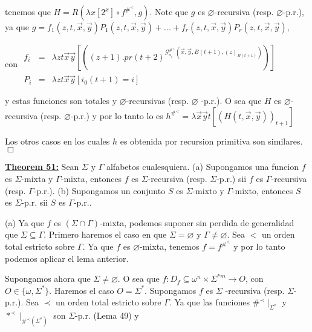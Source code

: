 tenemos que \(H=R(\lambda x\left[ 2^{x}\right] \circ f^{\#^{< }},g)\). Note que \(g\) es \(\varnothing \)-recursiva (resp. \(\varnothing \)-p.r.), ya que
\(\displaystyle g=f_{1}(z,t,\vec{x},\vec{y})P_{1}(z,t,\vec{x},\vec{y})+...+f_{r}(z,t,\vec{x}, \vec{y})P_{r}(z,t,\vec{x},\vec{y})\text{,} \)

con
\(\displaystyle \begin{array}{rcl} f_{i} & =& \lambda zt\vec{x}\vec{y}\left[ \left( (z+1).pr(t+2)^{\mathcal{G} _{a_{i}}^{\#^{< }}(\vec{x},\vec{y},B(t+1),(z)_{B(t+1)})}\right) \right] \\ P_{i} & =& \lambda zt\vec{x}\vec{y}\left[ i_{0}(t+1)=i\right] \end{array} \)

y estas funciones son totales y \(\varnothing \)-recursivas (resp. \(\varnothing \) -p.r.). O sea que \(H\) es \(\varnothing \)-recursiva (resp. \(\varnothing \)-p.r.) y por lo tanto lo es
\(\displaystyle h^{\#^{< }}=\lambda \vec{x}\vec{y}t\left[ (H(t,\vec{x},\vec{y}))_{t+1}\right] \)

Los otros casos en los cuales \(h\) es obtenida por recursion primitiva son similares. \(\Box\)


\textbf{\underline{Theorem 51:}} Sean \(\Sigma \) y \(\Gamma \) alfabetos cualesquiera.
(a) Supongamos una funcion \(f\) es \(\Sigma \)-mixta y \(\Gamma \)-mixta, entonces \(f\) es \(\Sigma \)-recursiva (resp. \(\Sigma \)-p.r.) sii \(f\) es \( \Gamma \)-recursiva (resp. \(\Gamma \)-p.r.).
(b) Supongamos un conjunto \(S\) es \(\Sigma \)-mixto y \(\Gamma \)-mixto, entonces \(S\) es \(\Sigma \)-p.r. sii \(S\) es \(\Gamma \)-p.r..


\PROOF (a) Ya que \(f\) es \((\Sigma \cap \Gamma )\)-mixta, podemos suponer sin perdida de generalidad que \(\Sigma \subseteq \Gamma \). Primero haremos el caso en que \(\Sigma =\varnothing \) y \(\Gamma \neq \varnothing \). Sea \(< \) un orden total estricto sobre \(\Gamma \). Ya que \(f\) es \(\varnothing \)-mixta, tenemos \( f=f^{\#^{< }}\) y por lo tanto podemos aplicar el lema anterior.

Supongamos ahora que \(\Sigma \neq \varnothing \). O sea que \(f:D_{f}\subseteq \omega ^{n}\times \Sigma ^{\ast m}\rightarrow O\), con \(O\in \{\omega ,\Sigma ^{\ast }\}.\) Haremos el caso \(O=\Sigma ^{\ast }.\) Supongamos \(f\) es \(\Sigma \) -recursiva (resp. \(\Sigma \)-p.r.). Sea \(\prec \) un orden total estricto sobre \(\Gamma .\) Ya que las funciones \(\#^{\prec }\mid _{\Sigma ^{\ast }}\) y \(\ast ^{\prec }\mid _{\#^{\prec }(\Sigma ^{\ast })}\) son \(\Sigma \)-p.r. (Lema 49) y

